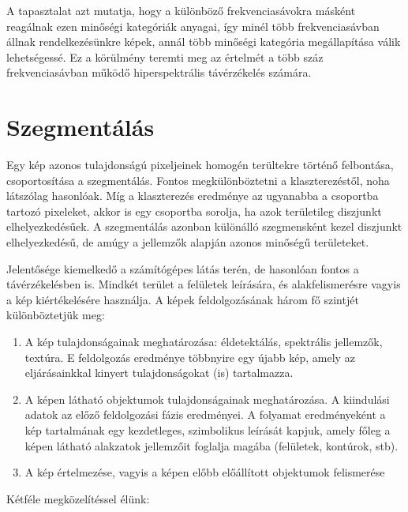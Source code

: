 \documentclass[a4paper,12pt]{article}
\begin{document}
A tapasztalat azt mutatja, hogy a különböző frekvenciasávokra másként reagálnak
ezen minőségi kategóriák anyagai, így minél több frekvenciasávban állnak
rendelkezésünkre képek, annál több minőségi kategória megállapítása válik
lehetségessé. Ez a körülmény teremti meg az értelmét a több száz frekvenciasávban
működő hiperspektrális távérzékelés számára.

\section{Szegmentálás}

Egy kép azonos tulajdonságú pixeljeinek homogén terültekre történő felbontása, csoportosítása a szegmentálás. Fontos megkülönböztetni a klaszterezéstől, noha látszólag hasonlóak. Míg a klaszterezés eredménye az ugyanabba a csoportba tartozó pixeleket, akkor is egy csoportba sorolja, ha azok területileg diszjunkt elhelyezkedésűek. A szegmentálás azonban különálló szegmensként kezel diszjunkt  elhelyezkedésű, de amúgy a jellemzők alapján azonos minőségű területeket.

Jelentősége kiemelkedő a számítógépes látás terén, de hasonlóan fontos a távérzékelésben is. Mindkét terület a felületek leírására, és alakfelismerésre vagyis a kép kiértékelésére használja. 
A képek feldolgozásának három fő szintjét különböztetjük meg:

\begin{enumerate}
	\item A kép tulajdonságainak meghatározása: éldetektálás, spektrális jellemzők, textúra. E feldolgozás	eredménye többnyire egy újabb kép, amely az eljárásainkkal kinyert	 tulajdonságokat (is) tartalmazza.
	
	\item A képen látható objektumok tulajdonságainak meghatározása. A kiindulási adatok az előző feldolgozási fázis eredményei. A folyamat eredményeként a kép tartalmának egy kezdetleges, szimbolikus leírását kapjuk, amely főleg a képen látható alakzatok jellemzőit foglalja magába (felületek, kontúrok, stb).
	
	\item A kép értelmezése, vagyis a képen előbb előállított objektumok felismerése
		
\end{enumerate}

Kétféle megközelítéssel élünk:
\end{document}
